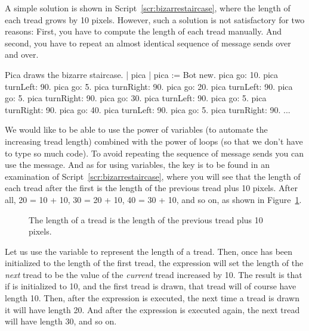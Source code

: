 \documentclass[a4paper,10pt,twoside]{book}
\begin{document}
A simple solution is shown in Script~\ref{scr:bizarrestaircase}, where the length of each tread grows by 10 pixels. However, such a solution is not satisfactory for two reasons: First, you have to compute 
the length of each tread manually. And second, you have to repeat an almost identical 
sequence of message sends over and over. 


\begin{script}[bizarrestaircase]{Pica draws the bizarre staircase.}
| pica | 
pica := Bot new. 
pica go: 10. 
pica turnLeft: 90. 
pica go: 5. 
pica turnRight: 90. 
pica go: 20. 
pica turnLeft: 90. 
pica go: 5. 
pica turnRight: 90. 
pica go: 30. 
pica turnLeft: 90. 
pica go: 5. 
pica turnRight: 90. 
pica go: 40. 
pica turnLeft: 90. 
pica go: 5. 
pica turnRight: 90. 
... 
\end{script}


We would like to be able to use the power of variables (to automate the increasing tread 
length) combined with the power of loops (so that we don’t have to type so much code). To 
avoid repeating the sequence of message sends you can use the  message. And as 
for using variables, the key is to be found in an examination of Script~\ref{scr:bizarrestaircase}, where you will see 
that the length of each tread after the first is the length of the previous tread plus 10 pixels. 
After all, 20 = 10 + 10, 30 = 20 + 10, 40 = 30 + 10, and so on, as shown in Figure~\ref{fig:escalierexplications}. 

\begin{figure}[h!]
\caption{The length of a tread is the length of the previous tread plus 10 pixels.\label{fig:escalierexplications}}
\end{figure}

Let us use the variable  to represent the length of a tread. Then, once 
 has been initialized to the length of the first tread, the expression 
 will set the length of the \emph{next} tread to be the value of the \emph{current} tread increased by 10. The result is that if  is initialized to 10, and the first tread is drawn, that tread will of course have length 10. Then, after the expression  is executed, the next time a tread is drawn it will have length 20. And after 
the expression is executed again, the next tread will have length 30, and so on. 
\end{document}
